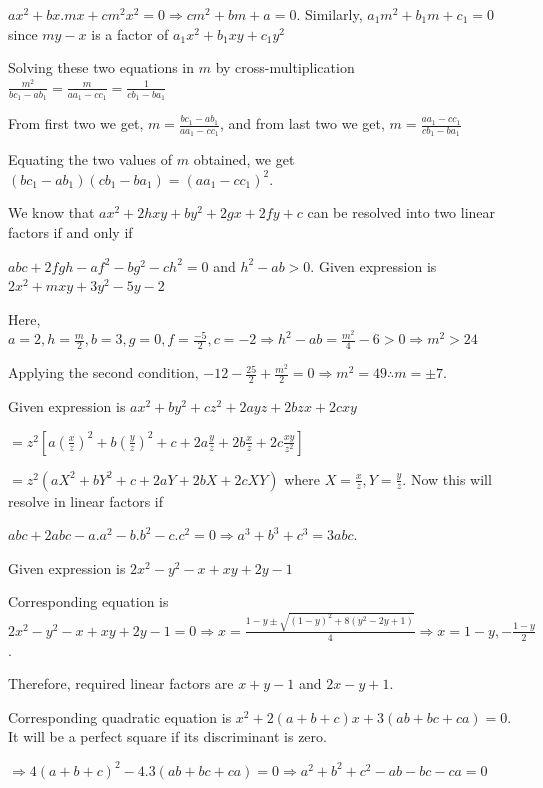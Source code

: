   $ax^2 + bx.mx + cm^2x^2 = 0 \Rightarrow cm^2 + bm + a = 0$. Similarly, $a_1m^2 + b_1m + c_1 = 0$ since $my
  - x$ is a factor of $a_1x^2 + b_1xy + c_1y^2$

  Solving these two equations in $m$ by cross-multiplication $\frac{m^2}{bc_1 - ab_1} = \frac{m}{aa_1 -
    cc_1} = \frac{1}{cb_1 - ba_1}$

  From first two we get, $m = \frac{bc_1 - ab_1}{aa_1 - cc_1}$, and from last two we get, $m = \frac{aa_1 -
    cc_1}{cb_1 - ba_1}$

  Equating the two values of $m$ obtained, we get $(bc_1 - ab_1)(cb_1 - ba_1) = (aa_1 - cc_1)^2$.
\item We know that $ax^2 + 2hxy + by^2 + 2gx + 2fy + c$ can be resolved into two linear factors if and only if

  $abc + 2fgh - af^2 - bg^2 - ch^2 = 0$ and $h^2 - ab > 0$. Given expression is $2x^2 + mxy + 3y^2 - 5y - 2$

  Here, $a = 2, h = \frac{m}{2}, b = 3, g = 0, f = \frac{-5}{2}, c = -2\Rightarrow h^2 - ab = \frac{m^2}{4}
  - 6 > 0\Rightarrow m^2 > 24$

  Applying the second condition, $-12 - \frac{25}{2} + \frac{m^2}{2} = 0\Rightarrow m^2 = 49 \therefore m =
  \pm 7$.
\item Given expression is $ax^2 + by^2 + cz^2 + 2ayz + 2bzx + 2cxy$

  $= z^2\left[a\left(\frac{x}{z}\right)^2 + b\left(\frac{y}{z}\right)^2 + c + 2a\frac{y}{z} + 2b\frac{x}{z}
  + 2c\frac{xy}{z^2}\right]$

  $= z^2(aX^2 + bY^2 + c + 2aY + 2bX + 2cXY)$ where $X = \frac{x}{z}, Y = \frac{y}{z}$. Now this will
  resolve in linear factors if

  $abc + 2abc - a.a^2 - b.b^2 -c.c^2 = 0\Rightarrow a^3 + b^3 + c^3 = 3abc$.
\item Given expression is $2x^2 - y^2 - x + xy + 2y -1$

  Corresponding equation is $2x^2 - y^2 - x + xy + 2y -1 = 0\Rightarrow x = \frac{1 - y \pm \sqrt{(1 - y)^2
      + 8(y^2 - 2y + 1)}}{4}\Rightarrow x = 1 - y, -\frac{1 - y}{2}$.

  Therefore, required linear factors are $x + y - 1$ and $2x - y + 1$.
\item Corresponding quadratic equation is $x^2 + 2(a + b + c)x + 3(ab + bc + ca) = 0$. It will be a perfect
  square if its discriminant is zero.

  $\Rightarrow 4(a + b + c)^2 - 4.3(ab + bc + ca) = 0\Rightarrow a^2 + b^2 + c^2 - ab - bc - ca =
  0$

